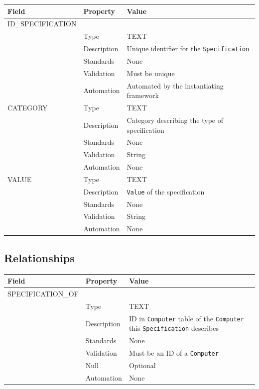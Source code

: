\documentclass[
]{article}
\newcounter{none}
\begin{document}
{\def\LTcaptype{none} 
\begin{longtable}[]{@{}lll@{}}
\toprule\noalign{}
Field & Property & Value \\
\midrule\noalign{}
\endhead
\bottomrule\noalign{}
\endlastfoot
ID\_SPECIFICATION & & \\
& Type & TEXT \\
& Description & Unique identifier for the \texttt{Specification} \\
& Standards & None \\
& Validation & Must be unique \\
& Automation & Automated by the instantiating framework \\
CATEGORY & Type & TEXT \\
& Description & Category describing the type of specification \\
& Standards & None \\
& Validation & String \\
& Automation & None \\
VALUE & Type & TEXT \\
& Description & \texttt{Value} of the specification \\
& Standards & None \\
& Validation & String \\
& Automation & None \\
\end{longtable}
}

\subsection{Relationships}\label{relationships-24}

{\def\LTcaptype{none} 
\begin{longtable}[]{@{}
  >{\raggedright\arraybackslash}p{}
  >{\raggedright\arraybackslash}p{}
  >{\raggedright\arraybackslash}p{}@{}}
\toprule\noalign{}
\begin{minipage}[b]{\linewidth}\raggedright
Field
\end{minipage} & \begin{minipage}[b]{\linewidth}\raggedright
Property
\end{minipage} & \begin{minipage}[b]{\linewidth}\raggedright
Value
\end{minipage} \\
\midrule\noalign{}
\endhead
\bottomrule\noalign{}
\endlastfoot
SPECIFICATION\_OF & & \\
& Type & TEXT \\
& Description & ID in \texttt{Computer} table of the \texttt{Computer}
this \texttt{Specification} describes \\
& Standards & None \\
& Validation & Must be an ID of a \texttt{Computer} \\
& Null & Optional \\
& Automation & None \\
\end{longtable}
}
\end{document}
